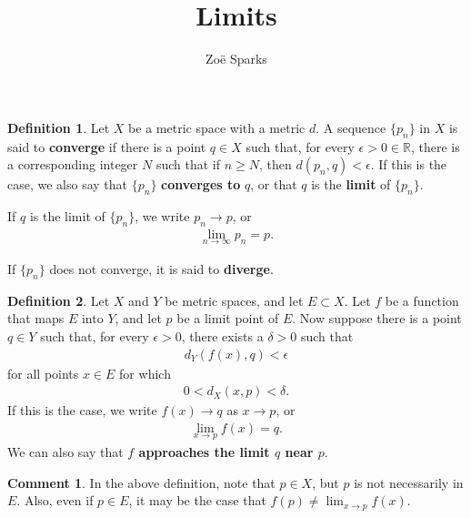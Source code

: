 \documentclass[12pt]{article}
\title{Limits}
\author{Zoë Sparks}
\begin{document}
\theoremstyle{definition}

\newtheorem{thm}{Theorem}
\newtheorem*{nthm}{Theorem}
\newtheorem{sthm}{}[thm]
\newtheorem{lemma}{Lemma}[thm]
\newtheorem*{nlemma}{Lemma}
\newtheorem{cor}{Corollary}[thm]
\newtheorem*{prop}{Property}
\newtheorem*{defn}{Definition}
\newtheorem*{comm}{Comment}
\newtheorem*{exm}{Example}

\maketitle

\begin{defn}
  Let $X$ be a metric space with a metric $d$. A sequence $\{p_n\}$ in $X$ is said to
  \textbf{converge} if there is a point $q \in X$ such that, for every $\epsilon > 0
  \in \mathbb{R}$, there is a corresponding integer $N$ such that if $n \geq N$, then
  $d(p_n,q) < \epsilon$. If this is the case, we also say that $\{p_n\}$
  \textbf{converges to} $q$, or that $q$ is the \textbf{limit} of $\{p_n\}$.

  If $q$ is the limit of $\{p_n\}$, we write $p_n \to p$, or
  \begin{align*}
    \lim_{n \to \infty} p_n = p.
  \end{align*}

  If $\{p_n\}$ does not converge, it is said to \textbf{diverge}.
\end{defn}

\begin{defn}
  Let $X$ and $Y$ be metric spaces, and let $E \subset X$. Let $f$ be a function that
  maps $E$ into $Y$, and let $p$ be a limit point of $E$. Now suppose there is a
  point $q \in Y$ such that, for every $\epsilon > 0$, there exists a $\delta > 0$
  such that
  \begin{align*}
    d_Y(f(x),q) < \epsilon
  \end{align*}
  for all points $x \in E$ for which
  \begin{align*}
    0 < d_X(x,p) < \delta.
  \end{align*}
  If this is the case, we write $f(x) \to q$ as $x \to p$, or
  \begin{align*}
    \lim_{x \to p} f(x) = q.
  \end{align*}
  We can also say that \textbf{$f$ approaches the limit $q$ near $p$}.
\end{defn}

\begin{comm}
  In the above definition, note that $p \in X$, but $p$ is not necessarily in $E$.
  Also, even if $p \in E$, it may be the case that $f(p) \neq \lim_{x \to p} f(x)$.
\end{comm}
\end{document}
